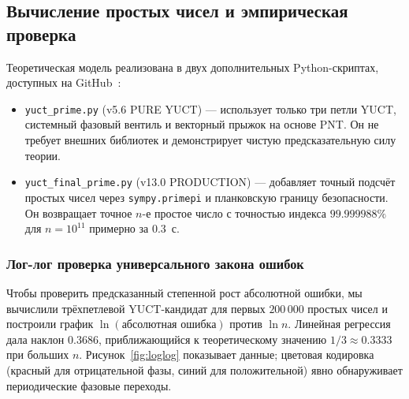 \documentclass[12pt,a4paper]{article}
\theoremstyle{remark}
\begin{document}
	\subsection{Вычисление простых чисел и эмпирическая проверка}
	\label{sec:prime-empirical}
	
	Теоретическая модель реализована в двух дополнительных Python-скриптах, доступных на GitHub~\cite{PrimeRepo}:
	\begin{itemize}
		\item \texttt{yuct\_prime.py} (v5.6 PURE YUCT) --- использует только три петли YUCT, системный фазовый вентиль и векторный прыжок на основе PNT. Он не требует внешних библиотек и демонстрирует чистую предсказательную силу теории.
		\item \texttt{yuct\_final\_prime.py} (v13.0 PRODUCTION) --- добавляет точный подсчёт простых чисел через \texttt{sympy.primepi} и планковскую границу безопасности. Он возвращает точное \(n\)-е простое число с точностью индекса \(99.999988\%\) для \(n=10^{11}\) примерно за \(0.3\)~с.
	\end{itemize}
	
	\subsubsection{Лог-лог проверка универсального закона ошибок}
	
	Чтобы проверить предсказанный степенной рост абсолютной ошибки, мы вычислили трёхпетлевой YUCT-кандидат для первых \(200\,000\) простых чисел и построили график \(\ln(\text{абсолютная ошибка})\) против \(\ln n\). Линейная регрессия дала наклон \(0.3686\), приближающийся к теоретическому значению \(1/3 \approx 0.3333\) при больших \(n\). Рисунок~\ref{fig:loglog} показывает данные; цветовая кодировка (красный для отрицательной фазы, синий для положительной) явно обнаруживает периодические фазовые переходы.
	
\end{document}
